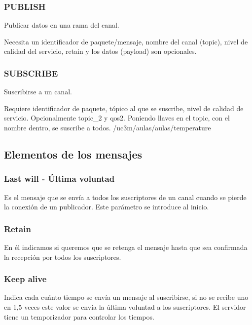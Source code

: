 \documentclass[12pt, twoside, openright]{report} %
\begin{document}
\subsubsection{PUBLISH}
Publicar datos en una rama del canal.

Necesita un identificador de paquete/mensaje, nombre del canal (topic), nivel de calidad del servicio, retain y los datos (payload) son opcionales.

\subsubsection{SUBSCRIBE}
Suscribirse a un canal.

Requiere identificador de paquete, tópico al que se suscribe, nivel de calidad de servicio. Opcionalmente topic\_2 y qos2. Poniendo llaves en el topic, con el nombre dentro, se suscribe a todos. /uc3m/aulas/{aulas}/temperature

\subsection{Elementos de los mensajes}

\subsubsection{Last will - Última voluntad}
Es el mensaje que se envía a todos los suscriptores de un canal cuando se pierde la conexión de un publicador. Este parámetro se introduce al inicio.

\subsubsection{Retain}
En él indicamos si queremos que se retenga el mensaje hasta que sea confirmada la recepción por todos los suscriptores.

\subsubsection{Keep alive}
Indica cada cuánto tiempo se envía un mensaje al suscribirse, si no se recibe uno en 1,5 veces este valor se envía la última voluntad a los suscriptores. El servidor tiene un temporizador para controlar los tiempos.
\end{document}
